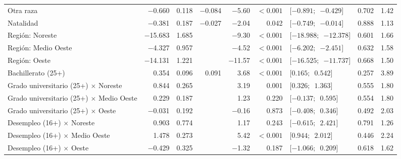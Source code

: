 {\begin{xltabular}{\linewidth}{>{\raggedright\arraybackslash}X r r r r r l r r}
Otra raza & \num{-0.660} & \num{0.118} & \num{-0.084} & \num{-5.60} & $<\num{0.001}$ & $[\num{-0.891};$\allowbreak\ $\num{-0.429}]$ & \num{0.702} & \num{1.42} \\
Natalidad & \num{-0.381} & \num{0.187} & \num{-0.027} & \num{-2.04} & \num{0.042} & $[\num{-0.749};$\allowbreak\ $\num{-0.014}]$ & \num{0.888} & \num{1.13} \\
Región: Noreste & \num{-15.683} & \num{1.685} &  & \num{-9.30} & $<\num{0.001}$ & $[\num{-18.988};$\allowbreak\ $\num{-12.378}]$ & \num{0.601} & \num{1.66} \\
Región: Medio Oeste & \num{-4.327} & \num{0.957} &  & \num{-4.52} & $<\num{0.001}$ & $[\num{-6.202};$\allowbreak\ $\num{-2.451}]$ & \num{0.632} & \num{1.58} \\
Región: Oeste & \num{-14.131} & \num{1.221} &  & \num{-11.57} & $<\num{0.001}$ & $[\num{-16.525};$\allowbreak\ $\num{-11.737}]$ & \num{0.668} & \num{1.50} \\
Bachillerato (25+) & \num{0.354} & \num{0.096} & \num{0.091} & \num{3.68} & $<\num{0.001}$ & $[\num{0.165};$\allowbreak\ $\num{0.542}]$ & \num{0.257} & \num{3.89} \\
Grado universitario (25+) $\times$ Noreste & \num{0.844} & \num{0.265} &  & \num{3.19} & \num{0.001} & $[\num{0.326};$\allowbreak\ $\num{1.363}]$ & \num{0.555} & \num{1.80} \\
Grado universitario (25+) $\times$ Medio Oeste & \num{0.229} & \num{0.187} &  & \num{1.23} & \num{0.220} & $[\num{-0.137};$\allowbreak\ $\num{0.595}]$ & \num{0.554} & \num{1.80} \\
Grado universitario (25+) $\times$ Oeste & \num{-0.031} & \num{0.192} &  & \num{-0.16} & \num{0.873} & $[\num{-0.408};$\allowbreak\ $\num{0.346}]$ & \num{0.492} & \num{2.03} \\
Desempleo (16+) $\times$ Noreste & \num{0.903} & \num{0.774} &  & \num{1.17} & \num{0.243} & $[\num{-0.615};$\allowbreak\ $\num{2.421}]$ & \num{0.791} & \num{1.26} \\
Desempleo (16+) $\times$ Medio Oeste & \num{1.478} & \num{0.273} &  & \num{5.42} & $<\num{0.001}$ & $[\num{0.944};$\allowbreak\ $\num{2.012}]$ & \num{0.446} & \num{2.24} \\
Desempleo (16+) $\times$ Oeste & \num{-0.429} & \num{0.325} &  & \num{-1.32} & \num{0.187} & $[\num{-1.066};$\allowbreak\ $\num{0.209}]$ & \num{0.618} & \num{1.62} \\
\end{xltabular}
}
